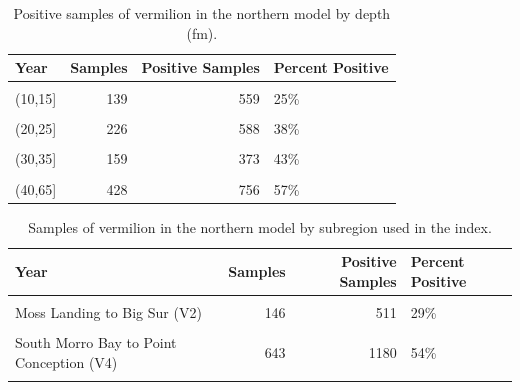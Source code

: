 \documentclass[
  english,
  a4paper,
]{article}
\begin{document}
\begin{table}

\caption{\label{tab:tab-depth-cpfvonboard}Positive samples of vermilion in the northern model by depth (fm).}
\centering
\begin{tabular}[t]{lrrl}
\toprule
Year & Samples & Positive Samples & Percent Positive\\
\midrule
\cellcolor{gray!6}{(0,10]} & \cellcolor{gray!6}{40} & \cellcolor{gray!6}{346} & \cellcolor{gray!6}{12\%}\\
(10,15] & 139 & 559 & 25\%\\
\cellcolor{gray!6}{(15,20]} & \cellcolor{gray!6}{279} & \cellcolor{gray!6}{808} & \cellcolor{gray!6}{35\%}\\
(20,25] & 226 & 588 & 38\%\\
\cellcolor{gray!6}{(25,30]} & \cellcolor{gray!6}{219} & \cellcolor{gray!6}{601} & \cellcolor{gray!6}{36\%}\\
\addlinespace
(30,35] & 159 & 373 & 43\%\\
\cellcolor{gray!6}{(35,40]} & \cellcolor{gray!6}{216} & \cellcolor{gray!6}{450} & \cellcolor{gray!6}{48\%}\\
(40,65] & 428 & 756 & 57\%\\
\bottomrule
\end{tabular}
\end{table}

\FloatBarrier

\begin{table}

\caption{\label{tab:tab-region-cpfvonboard}Samples of vermilion in the northern model by subregion used in the index.}
\centering
\begin{tabular}[t]{lrrl}
\toprule
Year & Samples & Positive Samples & Percent Positive\\
\midrule
\cellcolor{gray!6}{CA/OR border to Santa Cruz (V1)} & \cellcolor{gray!6}{238} & \cellcolor{gray!6}{1213} & \cellcolor{gray!6}{20\%}\\
Moss Landing to Big Sur (V2) & 146 & 511 & 29\%\\
\cellcolor{gray!6}{San Luis Obsipso to Morro Bay (V3)} & \cellcolor{gray!6}{591} & \cellcolor{gray!6}{1044} & \cellcolor{gray!6}{57\%}\\
South Morro Bay to Point Conception (V4) & 643 & 1180 & 54\%\\
\cellcolor{gray!6}{Offshore (V5)} & \cellcolor{gray!6}{88} & \cellcolor{gray!6}{533} & \cellcolor{gray!6}{17\%}\\
\bottomrule
\end{tabular}
\end{table}
\end{document}
